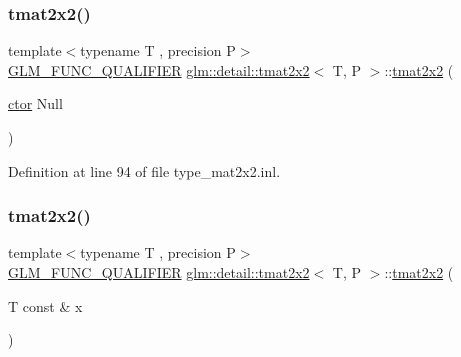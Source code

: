 \mbox{\label{structglm_1_1detail_1_1tmat2x2_a6b5779f97416696975e15936e8c96e0a}} 
\subsubsection{\texorpdfstring{tmat2x2()}{tmat2x2()}\hspace{0.1cm}{\footnotesize\ttfamily [4/22]}}
{\footnotesize\ttfamily template$<$typename T , precision P$>$ \\
\hyperlink{setup_8hpp_a33fdea6f91c5f834105f7415e2a64407}{G\+L\+M\+\_\+\+F\+U\+N\+C\+\_\+\+Q\+U\+A\+L\+I\+F\+I\+ER} \hyperlink{structglm_1_1detail_1_1tmat2x2}{glm\+::detail\+::tmat2x2}$<$ T, P $>$\+::\hyperlink{structglm_1_1detail_1_1tmat2x2}{tmat2x2} (\begin{DoxyParamCaption}\item[{\hyperlink{structglm_1_1detail_1_1tmat2x2_ac7c2fd8babbf9207cf08ffb92497a6c8}{ctor}}]{Null }\end{DoxyParamCaption})\hspace{0.3cm}{\ttfamily [explicit]}}



Definition at line 94 of file type\+\_\+mat2x2.\+inl.

\mbox{\label{structglm_1_1detail_1_1tmat2x2_a8fe44c67c08b09a6e1086593b600582d}} 
\subsubsection{\texorpdfstring{tmat2x2()}{tmat2x2()}\hspace{0.1cm}{\footnotesize\ttfamily [5/22]}}
{\footnotesize\ttfamily template$<$typename T , precision P$>$ \\
\hyperlink{setup_8hpp_a33fdea6f91c5f834105f7415e2a64407}{G\+L\+M\+\_\+\+F\+U\+N\+C\+\_\+\+Q\+U\+A\+L\+I\+F\+I\+ER} \hyperlink{structglm_1_1detail_1_1tmat2x2}{glm\+::detail\+::tmat2x2}$<$ T, P $>$\+::\hyperlink{structglm_1_1detail_1_1tmat2x2}{tmat2x2} (\begin{DoxyParamCaption}\item[{T const \&}]{x }\end{DoxyParamCaption})\hspace{0.3cm}{\ttfamily [explicit]}}



